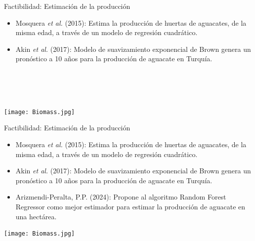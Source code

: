 \documentclass[aspectratio=169]{beamer}
\begin{document}
\begin{frame}{Factibilidad: Estimación de la producción}
	  \begin{minipage}{0.6\textwidth}
	  	\vspace{-1cm}\begin{block}{}
	  		\begin{itemize}
	  			\item Mosquera \textit{et al.} (2015): Estima la producción de huertas de aguacates, de la misma edad, a través de un modelo de regresión cuadrático.
	  			\item Akin \textit{et al.} (2017): Modelo de suavizamiento exponencial de Brown genera un pronóstico a 10 años para la producción de aguacate en Turquía.
	  		\end{itemize}
	  			\phantom{.}\\
	  			\phantom{.}\\
	  			\phantom{.}\\
	  	\end{block}
	  \end{minipage}%
	  \begin{minipage}{0.4\textwidth}
	  	\vspace{-0.5cm}\texttt{[image: Biomass.jpg]}
	  \end{minipage}%
\end{frame}

\begin{frame}{Factibilidad: Estimación de la producción}
	\begin{minipage}{0.6\textwidth}
		\vspace{-1cm}\begin{block}{}
			\begin{itemize}
				\item Mosquera \textit{et al.} (2015): Estima la producción de huertas de aguacates, de la misma edad, a través de un modelo de regresión cuadrático.
				\item Akin \textit{et al.} (2017): Modelo de suavizamiento exponencial de Brown genera un pronóstico a 10 años para la producción de aguacate en Turquía.
				\item Arizmendi-Peralta, P.P. (2024): Propone al algoritmo Random Forest Regressor como mejor estimador para estimar la producción de aguacate en una hectárea.
			\end{itemize}
		\end{block}
	\end{minipage}%
	\begin{minipage}{0.4\textwidth}
		\vspace{-0.5cm}\texttt{[image: Biomass.jpg]}
	\end{minipage}%
\end{frame}
\end{document}
